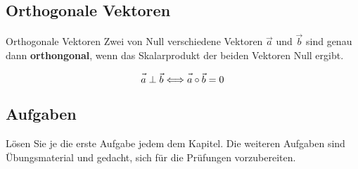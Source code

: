 \newpage

\subsection{Orthogonale Vektoren}

\begin{gesetz}{Orthogonale Vektoren}{}
  Zwei von Null verschiedene Vektoren $\vec{a}$ und $\vec{b}$ sind genau dann
  \textbf{orthongonal}, wenn das Skalarprodukt der beiden Vektoren
  Null ergibt.


  $$\vec{\vphantom{b}a} \perp \vec{b} \Longleftrightarrow
  \vec{\vphantom{b}a}\circ{}\vec{b} = 0$$
\end{gesetz}

\subsection*{Aufgaben}

Lösen Sie je die erste Aufgabe jedem dem Kapitel. Die weiteren Aufgaben
sind Übungsmaterial und gedacht, sich für die Prüfungen vorzubereiten.

